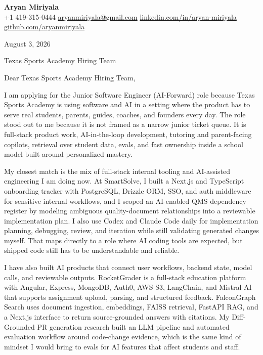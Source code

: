 \documentclass[letterpaper,11pt]{article}
\begin{document}
\begin{center}
    {\Large \textbf{Aryan Miriyala}}\\
    \vspace{2pt}
    +1 419-315-0444 \textbar{} \href{mailto:aryanmiriyala@gmail.com}{aryanmiriyala@gmail.com} \textbar{} \href{https://www.linkedin.com/in/aryan-miriyala-7788a21b6/}{linkedin.com/in/aryan-miriyala} \textbar{} \href{https://github.com/aryanmiriyala}{github.com/aryanmiriyala}
\end{center}

\vspace{10pt}

August 3, 2026

Texas Sports Academy Hiring Team

Dear Texas Sports Academy Hiring Team,

I am applying for the Junior Software Engineer (AI-Forward) role because Texas Sports Academy is using software and AI in a setting where the product has to serve real students, parents, guides, coaches, and founders every day. The role stood out to me because it is not framed as a narrow junior ticket queue. It is full-stack product work, AI-in-the-loop development, tutoring and parent-facing copilots, retrieval over student data, evals, and fast ownership inside a school model built around personalized mastery.

My closest match is the mix of full-stack internal tooling and AI-assisted engineering I am doing now. At SmartSolve, I built a Next.js and TypeScript onboarding tracker with PostgreSQL, Drizzle ORM, SSO, and auth middleware for sensitive internal workflows, and I scoped an AI-enabled QMS dependency register by modeling ambiguous quality-document relationships into a reviewable implementation plan. I also use Codex and Claude Code daily for implementation planning, debugging, review, and iteration while still validating generated changes myself. That maps directly to a role where AI coding tools are expected, but shipped code still has to be understandable and reliable.

I have also built AI products that connect user workflows, backend state, model calls, and reviewable outputs. RocketGrader is a full-stack education platform with Angular, Express, MongoDB, Auth0, AWS S3, LangChain, and Mistral AI that supports assignment upload, parsing, and structured feedback. FalconGraph Search uses document ingestion, embeddings, FAISS retrieval, FastAPI RAG, and a Next.js interface to return source-grounded answers with citations. My Diff-Grounded PR generation research built an LLM pipeline and automated evaluation workflow around code-change evidence, which is the same kind of mindset I would bring to evals for AI features that affect students and staff.
\end{document}
